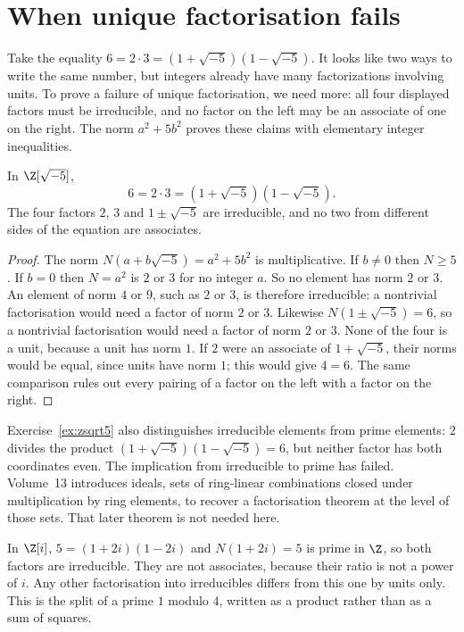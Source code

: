 \section{When unique factorisation fails}

Take the equality $6=2\cdot3=(1+\sqrt{-5})(1-\sqrt{-5})$. It looks like two ways to write the same number, but integers already have many factorizations involving units. To prove a failure of unique factorisation, we need more: all four displayed factors must be irreducible, and no factor on the left may be an associate of one on the right. The norm $a^2+5b^2$ proves these claims with elementary integer inequalities.

\begin{theorem}\label{thm:six}
In $\Z[\sqrt{-5}]$,
\[
6=2\cdot 3=(1+\sqrt{-5})(1-\sqrt{-5}).
\]
The four factors $2$, $3$ and $1\pm\sqrt{-5}$ are irreducible, and no two from different sides of the equation are associates.
\end{theorem}
\begin{proof}
The norm $N(a+b\sqrt{-5})=a^2+5b^2$ is multiplicative. If $b\ne0$ then $N\ge5$. If $b=0$ then $N=a^2$ is $2$ or $3$ for no integer $a$. So no element has norm $2$ or $3$. An element of norm $4$ or $9$, such as $2$ or $3$, is therefore irreducible: a nontrivial factorisation would need a factor of norm $2$ or $3$. Likewise $N(1\pm\sqrt{-5})=6$, so a nontrivial factorisation would need a factor of norm $2$ or $3$. None of the four is a unit, because a unit has norm $1$. If $2$ were an associate of $1+\sqrt{-5}$, their norms would be equal, since units have norm $1$; this would give $4=6$. The same comparison rules out every pairing of a factor on the left with a factor on the right.
\end{proof}

Exercise~\ref{ex:zsqrt5} also distinguishes irreducible elements from prime elements: $2$ divides the product $(1+\sqrt{-5})(1-\sqrt{-5})=6$, but neither factor has both coordinates even. The implication from irreducible to prime has failed. Volume~13 introduces ideals, sets of ring-linear combinations closed under multiplication by ring elements, to recover a factorisation theorem at the level of those sets. That later theorem is not needed here.

\begin{examplex}
In $\Z[i]$, $5=(1+2i)(1-2i)$ and $N(1+2i)=5$ is prime in $\Z$, so both factors are irreducible. They are not associates, because their ratio is not a power of $i$. Any other factorisation into irreducibles differs from this one by units only. This is the split of a prime $1$ modulo $4$, written as a product rather than as a sum of squares.
\end{examplex}

